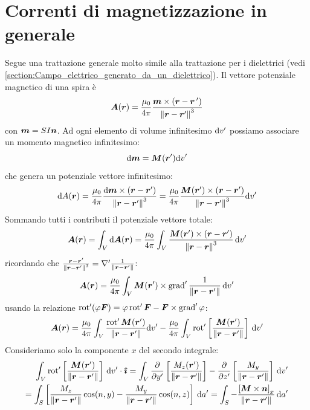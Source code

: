 \section{Correnti di magnetizzazione in generale}
Segue una trattazione generale molto simile alla trattazione per i dielettrici (vedi \ref{section:Campo_elettrico_generato_da_un_dielettrico}). Il vettore potenziale magnetico di una spira è
\begin{equation}
  \ve A(\ve r)=\frac{\mu_0}{4\pi}\frac{\ve m\times\left(\ve r-\ve r\,'\right)}{\norm{\ve r-\ve r'}^3}
\end{equation}
con $\ve m=SI\ve n$. Ad ogni elemento di volume infinitesimo $\ud v'$ possiamo associare un momento magnetico infinitesimo:
\begin{equation}
  \ud \ve m=\ve M(\ve r')\ud v'
\end{equation}
che genera un potenziale vettore infinitesimo:
\begin{equation}
  \ud A(\ve r)=\frac{\mu_0}{4\pi}\frac{\ud\ve m\times(\ve r-\ve r')}{\norm{\ve r-\ve r'}^3}=\frac{\mu_0}{4\pi}\frac{\ve M(\ve r')\times(\ve r-\ve r')}{\norm{\ve r-\ve r'}^3}\ud v'
\end{equation}
Sommando tutti i contributi il potenziale vettore totale:
\begin{equation}
  \ve A(\ve r)=\int_V\ud\ve A(\ve r)=\frac{\mu_0}{4\pi}\int_V\frac{\ve M(\ve r')\times(\ve r-\ve r')}{\norm{\ve r-\ve r}^3}\,\ud v'
\end{equation}
ricordando che $\frac{\ve r-\ve r'}{\norm{\ve r-\ve r'}^3}=\nabla'\frac{1}{\norm{\ve r-\ve r'}}$:
\begin{equation}
  \ve A(\ve r)=\frac{\mu_0}{4\pi}\int_V\ve M(\ve r')\times\grad'\frac{1}{\norm{\ve r-\ve r'}}\,\ud v'
\end{equation}
usando la relazione $\rot'(\varphi\ve F)=\varphi\rot'\ve F-\ve F\times\grad'\varphi$:
\begin{equation}
  \ve A(\ve r)=\frac{\mu_0}{4\pi}\int_V\frac{\rot'\ve M(\ve r')}{\norm{\ve r-\ve r'}}\ud v'-\frac{\mu_0}{4\pi}\int_V \rot'\left[\frac{\ve M(\ve r')}{\norm{\ve r-\ve r'}}\right]\,\ud v'
\end{equation}
Consideriamo solo la componente $x$ del secondo integrale:
\begin{equation}
  \begin{split}
    \int_V \rot'\left[\frac{\ve M(\ve r')}{\norm{\ve r-\ve r'}}\right]\,\ud v'\cdot\ver \imath=
    \int_V \frac{\partial}{\partial y'}\left[\frac{M_z(\ve r')}{\norm{\ve r-\ve r'}}\right]-\frac{\partial}{\partial z'}\left[\frac{M_y}{\norm{\ve r-\ve r'}}\right]\,\ud v'\\
    =\int_S\left[\frac{M_z}{\norm{\ve r-\ve r'}}\cos(n,y)-\frac{M_y}{\norm{\ve r-\ve r'}}\cos(n,z)\right]\,\ud a'=\int_S-\frac{\left[\ve M\times\ve n\right]_x}{\norm{\ve r-\ve r'}}\,\ud a'
  \end{split}
\end{equation}
